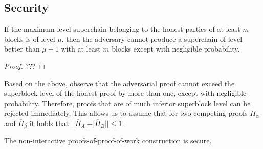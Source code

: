 \subsection{Security}

\begin{lemma}
    If the maximum level superchain belonging to the honest parties of at least
    $m$ blocks is of level $\mu$, then the adversary cannot produce a
    superchain of level better than $\mu + 1$ with at least $m$ blocks except
    with negligible probability.
\end{lemma}
\begin{proof}
    ???
\end{proof}

Based on the above, observe that the adversarial proof cannot exceed the
superblock level of the honest proof by more than one, except with negligible
probability. Therefore, proofs that are of much inferior superblock level can
be rejected immediately. This allows us to assume that for two competing proofs
$\overline{\Pi}_\alpha$ and $\overline{\Pi}_\beta$ it holds that
$||\overline{\Pi}_A| - |\overline{\Pi}_B|| \leq 1$.

\begin{theorem}
    The non-interactive proofs-of-proof-of-work construction is secure.
\end{theorem}

